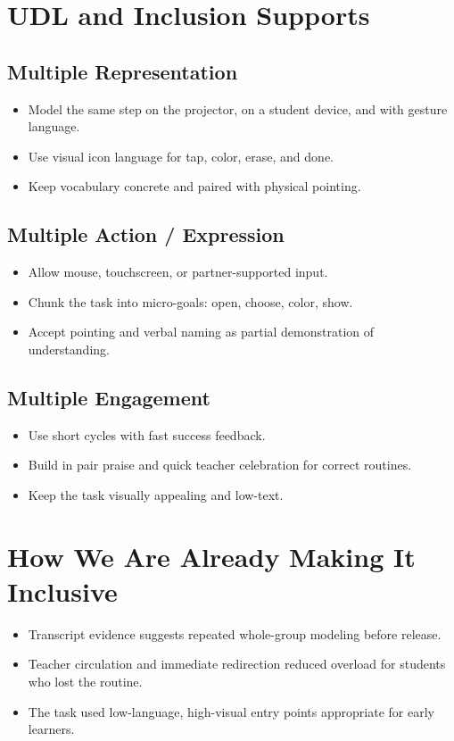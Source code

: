 \documentclass[11pt]{article}
\begin{document}
\section*{UDL and Inclusion Supports}
\subsection*{Multiple Representation}
\begin{itemize}[leftmargin=*]
\item Model the same step on the projector, on a student device, and with gesture language.
\item Use visual icon language for tap, color, erase, and done.
\item Keep vocabulary concrete and paired with physical pointing.
\end{itemize}

\subsection*{Multiple Action / Expression}
\begin{itemize}[leftmargin=*]
\item Allow mouse, touchscreen, or partner-supported input.
\item Chunk the task into micro-goals: open, choose, color, show.
\item Accept pointing and verbal naming as partial demonstration of understanding.
\end{itemize}

\subsection*{Multiple Engagement}
\begin{itemize}[leftmargin=*]
\item Use short cycles with fast success feedback.
\item Build in pair praise and quick teacher celebration for correct routines.
\item Keep the task visually appealing and low-text.
\end{itemize}

\section*{How We Are Already Making It Inclusive}
\begin{itemize}[leftmargin=*]
\item Transcript evidence suggests repeated whole-group modeling before release.
\item Teacher circulation and immediate redirection reduced overload for students who lost the routine.
\item The task used low-language, high-visual entry points appropriate for early learners.
\end{itemize}
\end{document}
